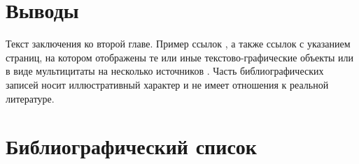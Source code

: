 \begin{refsection}
\section*{Выводы} \label{ch-11:conclusion}

Текст заключения ко второй главе. Пример ссылок \cite{Article,Book,Booklet,Conference,Inbook,Incollection,Manual,Mastersthesis,Misc,Phdthesis,Proceedings,Techreport,Unpublished,badiou:briefings}, а также ссылок с указанием страниц, на котором отображены те или иные текстово-графические объекты  \cite[с.~96]{Naidenova2017} или в виде мультицитаты на несколько источников \cites[с.~96]{Naidenova2017}[с.~46]{Ganter1999}. Часть библиографических записей носит иллюстративный характер и не имеет отношения к реальной литературе.


\section*{Библиографический список}
\FloatBarrier %


	
\printbibliography
\end{refsection}  
\newpage %